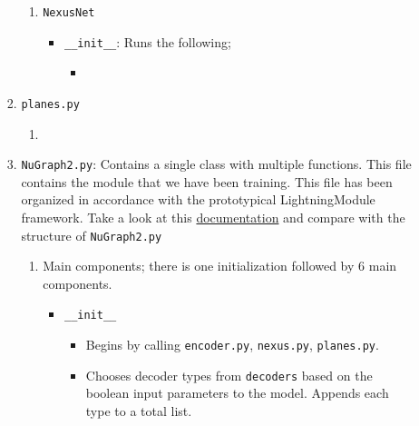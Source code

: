 \begin{itemize}
\begin{enumerate}
\begin{enumerate}
\begin{enumerate}
                            \item \texttt{NexusNet}
                                \begin{itemize} 
                                    \item \texttt{\_\_init\_\_}: Runs the following;
                                        \begin{itemize}
                                            \item \texttt{}
                                        \end{itemize}
                                \end{itemize}
                        \end{enumerate}

                    \item \texttt{planes.py}
                        \begin{enumerate}
                            \item
                        \end{enumerate}

                    \item \texttt{NuGraph2.py}: Contains a single class with multiple functions. This file contains the module that we have been training. This file has been organized in accordance with the prototypical LightningModule framework. Take a look at this \href{https://lightning.ai/docs/pytorch/stable/common/lightning_module.html}{\color{blue} documentation} and compare with the structure of \texttt{NuGraph2.py}
                        \begin{enumerate}
                            \item Main components; there is one initialization followed by 6 main components.
                            \begin{itemize}
                                \item \texttt{\_\_init\_\_}
                                \begin{itemize}
                                    \item Begins by calling \texttt{encoder.py}, \texttt{nexus.py}, \texttt{planes.py}.

                                    \item Chooses decoder types from \texttt{decoders} based on the boolean input parameters to the model. Appends each type to a total list.
                                \end{itemize}


\end{itemize}
\end{enumerate}
\end{enumerate}
\end{enumerate}
\end{itemize}
